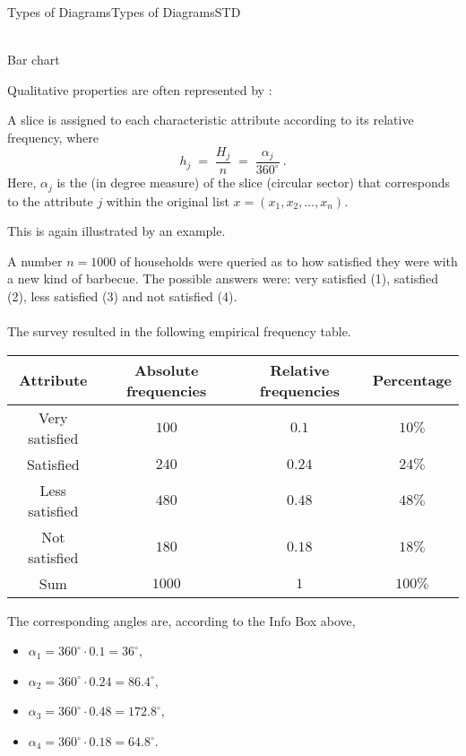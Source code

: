 \begin{MXContent}{Types of Diagrams}{Types of Diagrams}{STD}
\begin{center}
\\
Bar chart
\end{center}

Qualitative properties are often represented by :

\begin{MInfo}
A slice is assigned to each characteristic attribute according to its relative frequency, where
$$
h_{j} \; =\; \frac{H_{j}}{n}\;=\;  \frac{\alpha_{j}}{360^{\circ}}\: .
$$
Here, $\alpha_j$ is the  (in degree measure) of the slice (circular sector) that corresponds
to the attribute $j$ within the original list $x=(x_{1},x_{2},\ldots ,x_{n})$.
\end{MInfo}

This is again illustrated by an example. 

A number $n=1000$ of households were queried as to how satisfied they were with a new kind of barbecue. The possible answers were:
very satisfied (1), satisfied (2), less satisfied (3) and not satisfied (4). 
\ \\ \ \\
The survey resulted in the following empirical frequency table.

\begin{center}
\begin{tabular}{|c|c|c|c|}
\hline
Attribute & Absolute frequencies & Relative frequencies & Percentage \\ \hline
Very satisfied &  $100$ & $0.1$ & $10\%$ \\ \hline
Satisfied & $240$ & $0.24$ & $24\%$ \\ \hline
Less satisfied &$480$ & $0.48$ & $48\%$\\ \hline
Not satisfied & $180$ & $0.18$ & $18\%$ \\ \hline
Sum & $1000$ &  $1$ & $100\%$\\ \hline
\end{tabular}
\end{center}

The corresponding angles are, according to the Info Box above,

\begin{itemize}
\item{$\alpha_{1}=360^{\circ}\cdot 0.1=36^{\circ}$,}
\item{$\alpha_{2}=360^{\circ}\cdot 0.24=86.4^{\circ}$,}
\item{$\alpha_{3}=360^{\circ}\cdot 0.48=172.8^{\circ}$,}
\item{$\alpha_{4}=360^{\circ}\cdot 0.18=64.8^{\circ}$.}
\end{itemize}


\end{MXContent}
